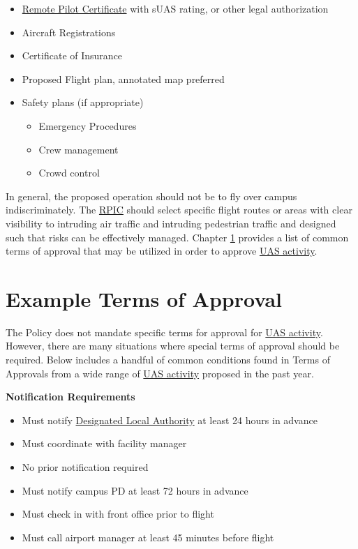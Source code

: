 \documentclass[
]{book}
\providecommand{\tightlist}{%
  \setlength{\itemsep}{0pt}\setlength{\parskip}{0pt}}
\begin{document}
\begin{itemize}
\item
  \protect\hyperlink{RPC}{Remote Pilot Certificate} with sUAS rating, or other legal authorization
\item
  Aircraft Registrations
\item
  Certificate of Insurance
\item
  Proposed Flight plan, annotated map preferred
\item
  Safety plans (if appropriate)

  \begin{itemize}
  \tightlist
  \item
    Emergency Procedures
  \item
    Crew management
  \item
    Crowd control
  \end{itemize}
\end{itemize}

In general, the proposed operation should not be to fly over campus indiscriminately. The \protect\hyperlink{RPIC}{RPIC} should select specific flight routes or areas with clear visibility to intruding air traffic and intruding pedestrian traffic and designed such that risks can be effectively managed. Chapter \ref{ch-example-terms} provides a list of common terms of approval that may be utilized in order to approve \protect\hyperlink{UASactivity}{UAS activity}.

\hypertarget{ch-example-terms}{%
\chapter{Example Terms of Approval}\label{ch-example-terms}}

The Policy does not mandate specific terms for approval for \protect\hyperlink{UASactivity}{UAS activity}. However, there are many situations where special terms of approval should be required. Below includes a handful of common conditions found in Terms of Approvals from a wide range of \protect\hyperlink{UASactivity}{UAS activity} proposed in the past year.

\textbf{Notification Requirements}

\begin{itemize}
\tightlist
\item
  Must notify \protect\hyperlink{DLA}{Designated Local Authority} at least 24 hours in advance
\item
  Must coordinate with facility manager
\item
  No prior notification required
\item
  Must notify campus PD at least 72 hours in advance
\item
  Must check in with front office prior to flight
\item
  Must call airport manager at least 45 minutes before flight
\end{itemize}
\end{document}
